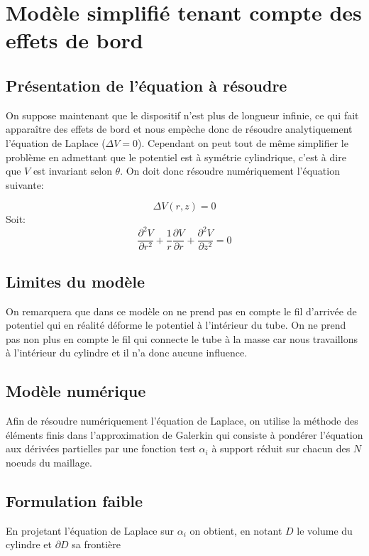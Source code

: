 \documentclass[a4paper,12pt]{article}
\begin{document}
\section{Modèle simplifié tenant compte des effets de bord}

\subsection{Présentation de l'équation à résoudre}
On suppose maintenant que le dispositif n'est plus de longueur infinie, ce qui fait apparaître des effets de bord et nous empèche donc de résoudre analytiquement l'équation de Laplace ($\Delta V=0$). Cependant on peut tout de même simplifier le problème en admettant que le potentiel est à symétrie cylindrique, c'est à dire que $V$ est invariant selon $\theta$. On doit donc résoudre numériquement l'équation suivante:

\begin{equation}
\Delta V(r,z)=0
\end{equation}
Soit:
\begin{equation}
\frac{\partial^2 V}{\partial r^2}+\frac{1}{r}\frac{\partial V}{ \partial r}+\frac{\partial^2 V}{\partial z^2}=0
\end{equation}

\subsection{Limites du modèle}
On remarquera que dans ce modèle on ne prend pas en compte le fil d'arrivée de potentiel qui en réalité déforme le potentiel à l'intérieur du tube. On ne prend pas non plus en compte le fil qui connecte le tube à la masse car nous travaillons à l'intérieur du cylindre et il n'a donc aucune influence.

\subsection{Modèle numérique}
Afin de résoudre numériquement l'équation de Laplace, on utilise la méthode des éléments finis dans l'approximation de Galerkin qui consiste à pondérer l'équation aux dérivées partielles par une fonction test $\alpha_i$ à support réduit sur chacun des $N$ noeuds du maillage.

\subsection{Formulation faible}
En projetant l'équation de Laplace sur $\alpha_i$ on obtient, en notant $D$ le volume du cylindre et $\partial D$ sa frontière
\end{document}
